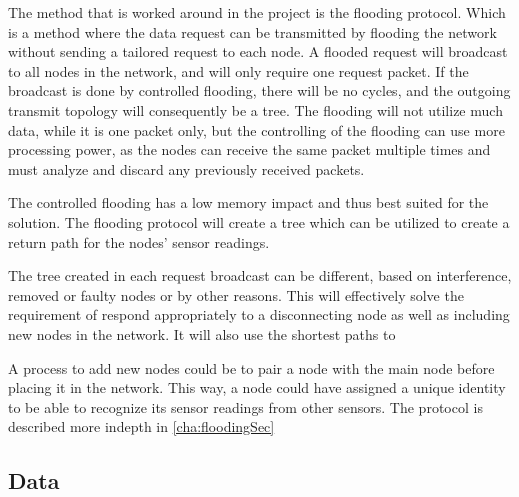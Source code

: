 The method that is worked around in the project is the flooding protocol.
Which is a method where the data request can be transmitted by flooding the network without sending a tailored request to each node. A flooded request will broadcast to all nodes in the network, and will only require one request packet. If the broadcast is done by controlled flooding, there will be no cycles, and the outgoing transmit topology will consequently be a tree. The flooding will not utilize much data, while it is one packet only, but the controlling of the flooding can use more processing power, as the nodes can receive the same packet multiple times and must analyze and discard any previously received packets.

The controlled flooding has a low memory impact and thus best suited for the solution. The flooding protocol will create a tree which can be utilized to create a return path for the nodes' sensor readings.

The tree created in each request broadcast can be different, based on interference, removed or faulty nodes or by other reasons. This will effectively solve the requirement of respond appropriately to a disconnecting node as well as including new nodes in the network. It will also use the shortest paths to 

A process to add new nodes could be to pair a node with the main node before placing it in the network. This way, a node could have assigned a unique identity to be able to recognize its sensor readings from other sensors. 
The protocol is described more indepth in \ref{cha:floodingSec}




\subsection{Data}

